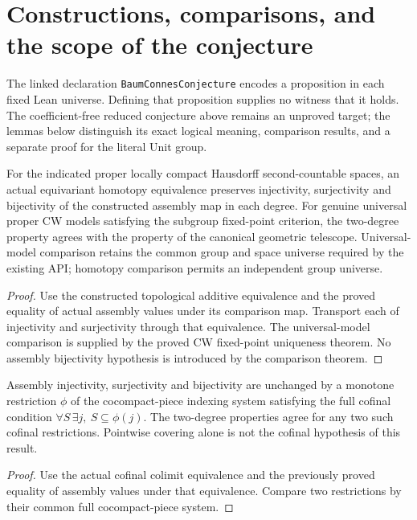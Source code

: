 \section{Constructions, comparisons, and the scope of the conjecture}
The linked declaration \texttt{BaumConnesConjecture} encodes a proposition
in each fixed Lean universe. Defining that proposition supplies no witness
that it holds. The coefficient-free reduced conjecture above remains an
unproved target; the lemmas below distinguish its exact logical meaning,
comparison results, and a separate proof for the literal Unit group.

\begin{proposition}\label{prop:baum-connes-model-invariance}
\leanok
For the indicated proper locally compact Hausdorff second-countable spaces,
an actual equivariant homotopy equivalence preserves injectivity,
surjectivity and bijectivity of the constructed assembly map in each degree.
For genuine universal proper CW models satisfying the subgroup fixed-point
criterion, the two-degree property agrees with the property of the canonical
geometric telescope. Universal-model comparison retains the common group
and space universe required by the existing API; homotopy comparison permits
an independent group universe.
\end{proposition}
\begin{proof}
\leanok
Use the constructed topological additive equivalence and the proved equality
of actual assembly values under its comparison map. Transport each of
injectivity and surjectivity through that equivalence. The universal-model
comparison is supplied by the proved CW fixed-point uniqueness theorem.
No assembly bijectivity hypothesis is introduced by the comparison theorem.
\end{proof}

\begin{proposition}\label{prop:baum-connes-cofinal-invariance}
\leanok
Assembly injectivity, surjectivity and bijectivity are unchanged by a monotone
restriction $\phi$ of the cocompact-piece indexing system satisfying the full
cofinal condition $\forall S\,\exists j,\ S\subseteq\phi(j)$. The two-degree
properties agree for any two such cofinal restrictions. Pointwise covering
alone is not the cofinal hypothesis of this result.
\end{proposition}
\begin{proof}
\leanok
Use the actual cofinal colimit equivalence and the previously proved equality
of assembly values under that equivalence. Compare two restrictions by their
common full cocompact-piece system.
\end{proof}

